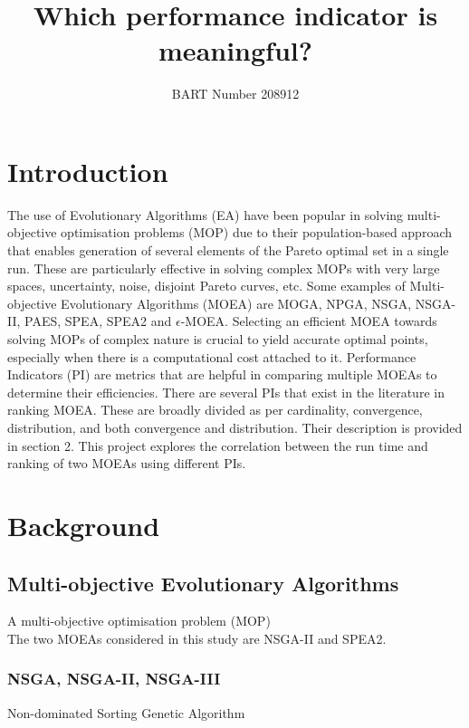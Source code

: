 \documentclass[sigconf,nonacm]{acmart}
\begin{document}
\title[Short title]{Which performance indicator is meaningful?}
\author{BART Number 208912}

\begin{abstract}
	
\end{abstract}

\maketitle

\section{Introduction}
The use of Evolutionary Algorithms (EA) have been popular in solving multi-objective optimisation problems (MOP) due to their population-based approach that enables generation of several elements of the Pareto optimal set in a single run. These are particularly effective in solving complex MOPs with very large spaces, uncertainty, noise, disjoint Pareto curves, etc. Some examples of Multi-objective Evolutionary Algorithms (MOEA) are MOGA, NPGA, NSGA, NSGA-II, PAES, SPEA, SPEA2 and $\epsilon$-MOEA\cite{moea2007, deb2002}. Selecting an efficient MOEA towards solving MOPs of complex nature is crucial to yield accurate optimal points, especially when there is a computational cost attached to it. Performance Indicators (PI) are metrics that are helpful in comparing multiple MOEAs to determine their efficiencies. There are several PIs that exist in the literature in ranking MOEA. These are broadly divided as per cardinality, convergence, distribution, and both convergence and distribution. Their description is provided in section 2. This project explores the correlation between the run time and ranking of two MOEAs using different PIs.

\balance

\section{Background}
\subsection{Multi-objective Evolutionary Algorithms}
A multi-objective optimisation problem (MOP) \\
The two MOEAs considered in this study are NSGA-II and SPEA2.
\subsubsection{NSGA, NSGA-II, NSGA-III}
Non-dominated Sorting Genetic Algorithm
\end{document}
